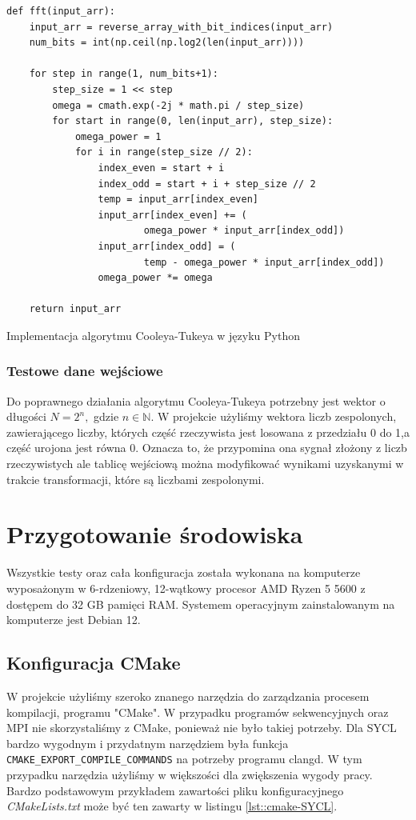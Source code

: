 \documentclass[a4paper,12pt]{book} %
\begin{document}
\begin{lstfloat}[H]
\lstset{language=Python}
\begin{lstlisting}[frame=single]
def fft(input_arr):
    input_arr = reverse_array_with_bit_indices(input_arr)
    num_bits = int(np.ceil(np.log2(len(input_arr))))

    for step in range(1, num_bits+1):
        step_size = 1 << step
        omega = cmath.exp(-2j * math.pi / step_size)
        for start in range(0, len(input_arr), step_size):
            omega_power = 1
            for i in range(step_size // 2):
                index_even = start + i
                index_odd = start + i + step_size // 2
                temp = input_arr[index_even]
                input_arr[index_even] += (
                        omega_power * input_arr[index_odd])
                input_arr[index_odd] = (
                        temp - omega_power * input_arr[index_odd])
                omega_power *= omega

    return input_arr
\end{lstlisting}
\caption{Implementacja algorytmu Cooleya-Tukeya w języku Python}
\label{lst:fft_python}
\end{lstfloat}
\subsubsection{Testowe dane wejściowe}
Do poprawnego działania algorytmu Cooleya-Tukeya potrzebny jest wektor o długości $N = 2^n,$ gdzie $n \in \mathbb{N}$. W projekcie użyliśmy wektora liczb zespolonych, zawierającego liczby, których część rzeczywista jest losowana z przedziału 0 do 1,a część urojona jest równa 0. Oznacza to, że przypomina ona sygnał złożony z liczb rzeczywistych ale tablicę wejściową można modyfikować wynikami uzyskanymi w trakcie transformacji, które są liczbami zespolonymi.
\section{Przygotowanie środowiska}
Wszystkie testy oraz cała konfiguracja została wykonana na komputerze wyposażonym w 6-rdzeniowy, 12-wątkowy procesor AMD Ryzen 5 5600 z dostępem do 32 GB pamięci RAM.
Systemem operacyjnym zainstalowanym na komputerze jest Debian 12.
\subsection{Konfiguracja CMake}
W projekcie użyliśmy szeroko znanego narzędzia do zarządzania procesem kompilacji, programu "CMake". W przypadku programów sekwencyjnych oraz MPI nie skorzystaliśmy z CMake, ponieważ nie było takiej potrzeby.
Dla SYCL bardzo wygodnym i przydatnym narzędziem była funkcja \texttt{CMAKE\_EXPORT\_COMPILE\_COMMANDS} na potrzeby programu clangd. W tym przypadku narzędzia użyliśmy w większości dla zwiększenia wygody pracy. Bardzo podstawowym przykładem zawartości pliku konfiguracyjnego \emph{CMakeLists.txt} może być ten zawarty w listingu \ref{lst::cmake-SYCL}.
\end{document}

